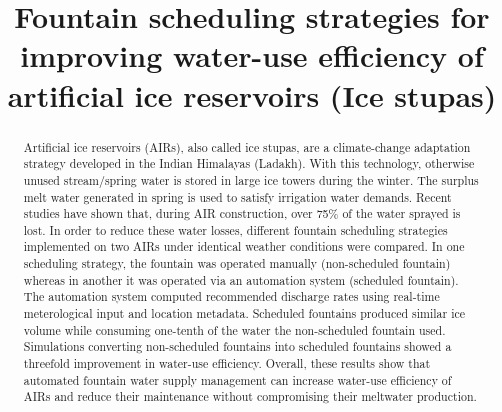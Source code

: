 \documentclass[tc, manuscript]{copernicus}
\begin{document}
\title{Fountain scheduling strategies for improving water-use efficiency of artificial ice reservoirs (Ice stupas)}

\def\Authors{Suryanarayanan Balasubramanian\,$^{1,2}$, Martin Hoelzle\,$^{1}$Roger Waser\,$^{3}$}

\def\Address{$^{1}$University of Fribourg, Department of Geosciences, Fribourg, Switzerland $^{2}$University of
Applied Sciences and Arts, Luzern, Switzerland} \def\corrAuthor{Suryanarayanan Balasubramanian}





\maketitle

\begin{abstract}

  Artificial ice reservoirs (AIRs), also called ice stupas, are a climate-change adaptation strategy developed
  in the Indian Himalayas (Ladakh). With this technology, otherwise unused stream/spring water is stored in
  large ice towers during the winter. The surplus melt water generated in spring is used to satisfy irrigation
  water demands. Recent studies have shown that, during AIR construction, over 75\% of the water sprayed is
  lost. In order to reduce these water losses, different fountain scheduling strategies implemented on two AIRs
  under identical weather conditions were compared. In one scheduling strategy, the fountain was operated
  manually (non-scheduled fountain) whereas in another it was operated via an automation system (scheduled
  fountain). The automation system computed recommended discharge rates using real-time meterological input and
  location metadata. Scheduled fountains produced similar ice volume while consuming one-tenth of the water the
  non-scheduled fountain used. Simulations converting non-scheduled fountains into scheduled fountains showed a
  threefold improvement in water-use efficiency. Overall, these results show that automated fountain water
  supply management can increase water-use efficiency of AIRs and reduce their maintenance without compromising
  their meltwater production.

\end{abstract}
\end{document}
